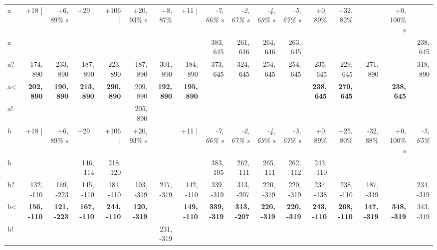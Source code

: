 \begin{table}[p]
{\begin{tabular}{lrrrrrrrrrrrrrrrr}
a~ & +18 | & +6, 89\% s & +29 | & +106 | & +20, 93\% s & +8, 87\% & +11 | & \textit{-7, 66\% s} & \textit{-2, 67\% s} & \textit{-4, 69\% s} & \textit{-5, 67\% s} & +0, 89\% & +32, 82\% &  & +0, 100\% s &  \\
a &  &  &  &  &  &  &  & 383, 645 & 261, 646 & 264, 646 & 263, 645 &  &  &  &  & 238, 645 \\
a? & 174, 890 & 233, 890 & 187, 890 & 223, 890 & 187, 890 & 301, 890 & 184, 890 & 373, 645 & 324, 645 & 254, 645 & 254, 645 & 235, 645 & 229, 645 & 271, 890 &  & 318, 890 \\
a< & \textbf{202, 890} & \textbf{190, 890} & \textbf{213, 890} & \textbf{290, 890} & 209, 890 & \textbf{192, 890} & \textbf{195, 890} &  &  &  &  & \textbf{238, 645} & \textbf{270, 645} &  & \textbf{238, 645} &  \\
a! &  &  &  &  & 205, 890 &  &  &  &  &  &  &  &  &  &  &  \\
b~ & +18 | & +6, 89\% s & +29 | & +106 | & +20, 93\% s &  & +11 | & \textit{-7, 66\% s} & \textit{-2, 67\% s} & \textit{-4, 69\% s} & \textit{-5, 67\% s} & +0, 89\% & +25, 80\% & -32, 88\% & +0, 100\% s & \textit{-5, 65\%} \\
b &  &  & 146, -114 & 218, -120 &  &  &  & 383, -105 & 262, -111 & 265, -111 & 262, -112 & 243, -110 &  &  &  &  \\
b? & 132, -110 & 169, -223 & 145, -110 & 181, -110 & 103, -319 & 217, -319 & 142, -110 & 339, -319 & 313, -207 & 220, -319 & 220, -319 & 237, -138 & 238, -110 & 187, -319 &  & 234, -319 \\
b< & \textbf{156, -110} & \textbf{121, -223} & \textbf{167, -110} & \textbf{244, -110} & \textbf{120, -319} &  & \textbf{149, -110} & \textbf{339, -319} & \textbf{313, -207} & \textbf{220, -319} & \textbf{220, -319} & \textbf{243, -110} & \textbf{268, -110} & \textbf{147, -319} & \textbf{348, -319} & 343, -319 \\
b! &  &  &  &  &  & 231, -319 &  &  &  &  &  &  &  &  &  &  \\

\end{tabular}
}
\end{table}
\clearpage


